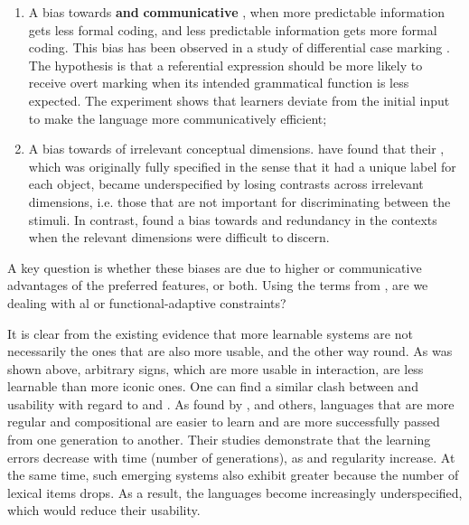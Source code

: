 \documentclass[output=paper]{langsci/langscibook}
\begin{document}
\begin{enumerate}
\item 
A bias towards \textbf{} \textbf{and} \textbf{communicative} \textbf{}, when more predictable information gets less formal coding, and less predictable information gets more formal coding. This bias has been observed in a study of differential case marking \citep{FedzechkinaEtAl2012}. The hypothesis is that a referential expression should be more likely to receive overt  marking when its intended grammatical function is less expected. The experiment shows that learners deviate from the initial input to make the language more communicatively efficient;
\item 
A bias towards \textbf{} of irrelevant conceptual dimensions. \citet{SilveyEtAl2015} have found that their , which was originally fully specified in the sense that it had a unique label for each object, became underspecified by losing contrasts across irrelevant dimensions, i.e. those that are not important for discriminating between the stimuli. In contrast, \citet{TinitsEtAl2017} found a bias towards  and redundancy in the contexts when the relevant dimensions were difficult to discern.  
\end{enumerate}

A key question is whether these biases are due to higher  or communicative advantages of the preferred features, or both. Using the terms from , are we dealing with al or functional-adaptive constraints? 

It is clear from the existing evidence that more learnable systems are not necessarily the ones that are also more usable, and the other way round. As was shown above, arbitrary signs, which are more usable in interaction, are less learnable than more iconic ones. One can find a similar clash between  and usability with regard to  and . As found by \citet{KirbyEtAl2008}, \citet{Verhoef2012} and others, languages that are more regular and compositional are easier to learn and are more successfully passed from one generation to another. Their studies demonstrate that the learning errors decrease with time (number of generations), as  and regularity increase. At the same time, such emerging systems also exhibit greater  because the number of lexical items drops. As a result, the languages become increasingly underspecified, which would reduce their usability. 
\end{document}
